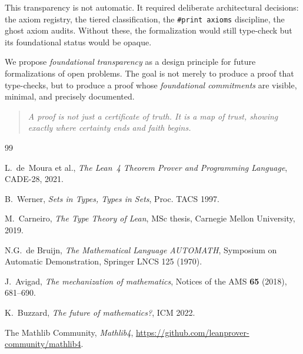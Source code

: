 \documentclass[11pt,a4paper]{article}
\theoremstyle{plain}
\theoremstyle{definition}
\newcommand{\lean}[1]{\texttt{#1}}
\begin{document}
This transparency is not automatic. It required deliberate
architectural decisions: the axiom registry, the tiered classification,
the \lean{\#print axioms} discipline, the ghost axiom audits. Without
these, the formalization would still type-check but its foundational
status would be opaque.

We propose \emph{foundational transparency} as a design principle
for future formalizations of open problems. The goal is not merely
to produce a proof that type-checks, but to produce a proof whose
\emph{foundational commitments} are visible, minimal, and precisely
documented.

\begin{quote}
\emph{A proof is not just a certificate of truth. It is a map of
trust, showing exactly where certainty ends and faith begins.}
\end{quote}

\vspace{1cm}

\begin{thebibliography}{99}

L.~de~Moura et al., \emph{The Lean~4 Theorem Prover and Programming
Language}, CADE-28, 2021.

B.~Werner, \emph{Sets in Types, Types in Sets}, Proc. TACS 1997.

M.~Carneiro, \emph{The Type Theory of Lean}, MSc thesis,
Carnegie Mellon University, 2019.

N.G.~de Bruijn, \emph{The Mathematical Language AUTOMATH},
Symposium on Automatic Demonstration, Springer LNCS 125 (1970).

J.~Avigad, \emph{The mechanization of mathematics}, Notices of the
AMS \textbf{65} (2018), 681--690.

K.~Buzzard, \emph{The future of mathematics?}, ICM 2022.

The Mathlib Community, \emph{Mathlib4},
\url{https://github.com/leanprover-community/mathlib4}.

\end{thebibliography}
\end{document}
